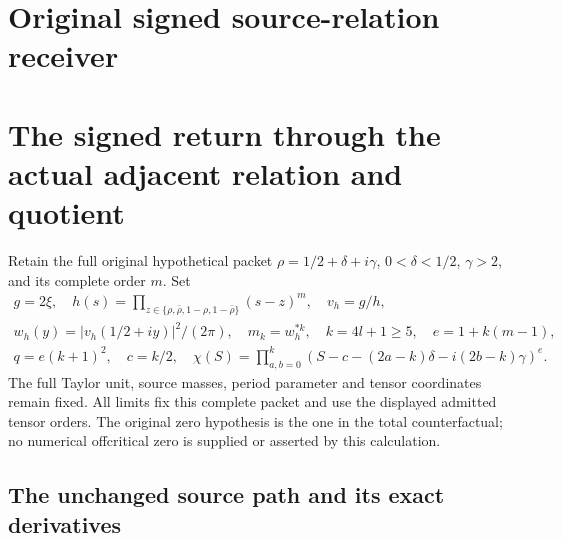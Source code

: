 \documentclass[11pt,a4paper]{article}
\begin{document}
\section*{Original signed source-relation receiver}
\begingroup
\section{The signed return through the actual adjacent relation and quotient}
\label{sxr:sec:sxr}

Retain the full original hypothetical packet
$\rho=1/2+\delta+i\gamma$, $0<\delta<1/2$, $\gamma>2$, and its
complete order $m$. Set
\begin{equation}\tag{SXR1}
\begin{gathered}
 g=2\xi,\quad h(s)=\prod_{z\in\{\rho,\bar\rho,1-\rho,1-\bar\rho\}}
                    (s-z)^m,\quad v_h=g/h,\\
 w_h(y)=|v_h(1/2+iy)|^2/(2\pi),\quad m_k=w_h^{*k},\quad
 k=4l+1\ge5,\quad e=1+k(m-1),\\
 q=e(k+1)^2,\quad c=k/2,\quad
 \chi(S)=\prod_{a,b=0}^k
  (S-c-(2a-k)\delta-i(2b-k)\gamma)^e.
\end{gathered}
\end{equation}
The full Taylor unit, source masses, period parameter and tensor
coordinates remain fixed. All limits fix this complete packet and
use the displayed admitted tensor orders. The original zero hypothesis
is the one in the total counterfactual; no numerical offcritical zero
is supplied or asserted by this calculation.

\subsection{The unchanged source path and its exact derivatives}
\end{document}
